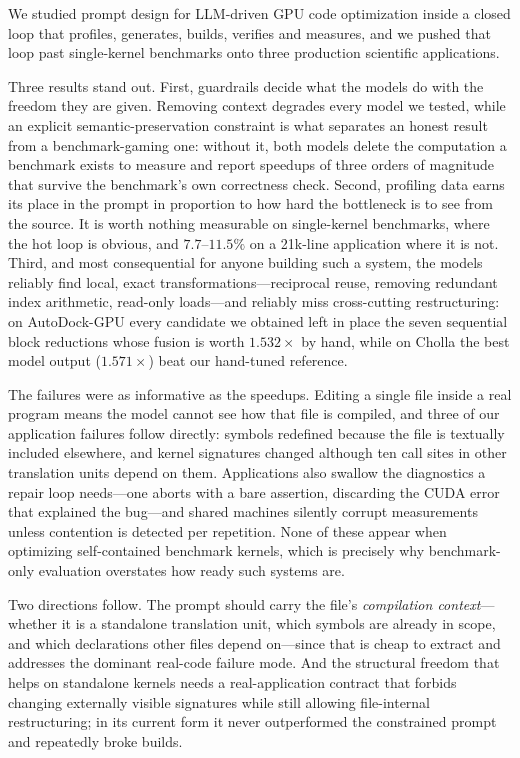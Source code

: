We studied prompt design for LLM-driven GPU code optimization inside a closed loop that profiles,
generates, builds, verifies and measures, and we pushed that loop past single-kernel benchmarks onto
three production scientific applications.

Three results stand out. First, guardrails decide what the models do with the freedom they are given.
Removing context degrades every model we tested, while an explicit semantic-preservation constraint is
what separates an honest result from a benchmark-gaming one: without it, both models delete the
computation a benchmark exists to measure and report speedups of three orders of magnitude that survive
the benchmark's own correctness check. Second, profiling data earns its place in the prompt in
proportion to how hard the bottleneck is to see from the source. It is worth nothing measurable on
single-kernel benchmarks, where the hot loop is obvious, and $7.7$--$11.5\%$ on a 21k-line application
where it is not. Third, and most consequential for anyone building such a system, the models reliably
find local, exact transformations---reciprocal reuse, removing redundant index arithmetic, read-only
loads---and reliably miss cross-cutting restructuring: on AutoDock-GPU every candidate we obtained left in
place the seven sequential block reductions whose fusion is worth $1.532\times$ by hand, while on Cholla the best model output ($1.571\times$) beat our hand-tuned reference.

The failures were as informative as the speedups. Editing a single file inside a real program means the
model cannot see how that file is compiled, and three of our application failures follow directly:
symbols redefined because the file is textually included elsewhere, and kernel signatures changed
although ten call sites in other translation units depend on them. Applications also swallow the
diagnostics a repair loop needs---one aborts with a bare assertion, discarding the CUDA error that
explained the bug---and shared machines silently corrupt measurements unless contention is detected per
repetition. None of these appear when optimizing self-contained benchmark kernels, which is precisely
why benchmark-only evaluation overstates how ready such systems are.

Two directions follow. The prompt should carry the file's \emph{compilation context}---whether it is a
standalone translation unit, which symbols are already in scope, and which declarations other files
depend on---since that is cheap to extract and addresses the dominant real-code failure mode. And the
structural freedom that helps on standalone kernels needs a real-application contract that forbids
changing externally visible signatures while still allowing file-internal restructuring; in its current
form it never outperformed the constrained prompt and repeatedly broke builds.
